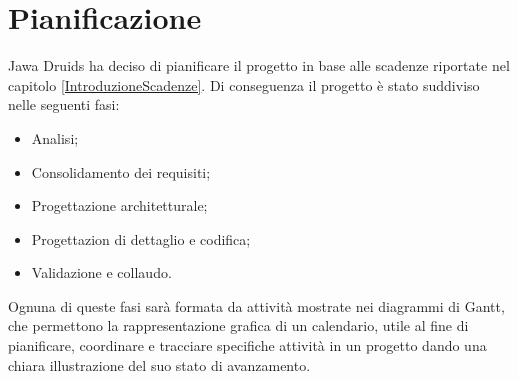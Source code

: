 \chapter{Pianificazione}\label{Pianificazione}
Jawa Druids ha deciso di pianificare il progetto in base alle scadenze riportate nel capitolo \ref{IntroduzioneScadenze}. Di conseguenza il progetto è stato suddiviso nelle seguenti fasi:
\begin{itemize}
	\item Analisi;
	\item Consolidamento dei requisiti;
	\item Progettazione architetturale;
	\item Progettazion di dettaglio e codifica;
	\item Validazione e collaudo.
\end{itemize}
Ognuna di queste fasi sarà formata da attività mostrate nei diagrammi di Gantt, che permettono la rappresentazione grafica di un calendario, utile al fine di pianificare, coordinare e tracciare specifiche attività in un progetto dando una chiara illustrazione del suo stato di avanzamento.
